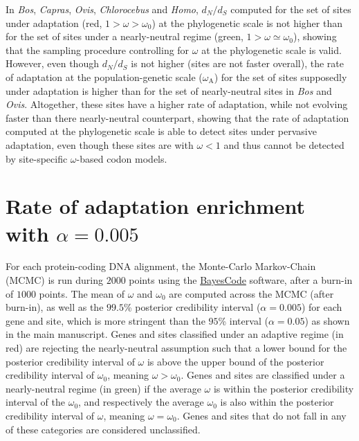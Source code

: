 \documentclass{article}
\renewcommand*{\bm}[1]{#1}%
\newcommand{\dn}{d_N}
\newcommand{\ds}{d_S}
\newcommand{\dnds}{\dn / \ds}
\newcommand{\rateApop}{\omega_{\mathrm{A}}}
\begin{document}
    \pagebreak

    

    In \textit{Bos}, \textit{Capras}, \textit{Ovis}, \textit{Chlorocebus} and \textit{Homo}, $\dnds$ computed for the set of sites under adaptation (red, $1 > \omega > \omega_{0}$) at the phylogenetic scale is not higher than for the set of sites under a nearly-neutral regime (green, $1 > \omega \simeq \omega_{0}$), showing that the sampling procedure controlling for $\omega$ at the phylogenetic scale is valid.
    However, even though $\dnds$ is not higher (sites are not faster overall), the rate of adaptation at the population-genetic scale ($\rateApop$) for the set of sites supposedly under adaptation is higher than for the set of nearly-neutral sites in \textit{Bos} and \textit{Ovis}.
    Altogether, these sites have a higher rate of adaptation, while not evolving faster than there nearly-neutral counterpart, showing that the rate of adaptation computed at the phylogenetic scale is able to detect sites under pervasive adaptation, even though these sites are with $\omega < 1$ and thus cannot be detected by site-specific $\omega$-based codon models.

    \pagebreak


    \section{Rate of adaptation enrichment with $\bm{\alpha=0.005}$}
    \label{sec:threshold}
    For each protein-coding DNA alignment, the Monte-Carlo Markov-Chain (MCMC) is run during $2000$ points using the \href{https://github.com/bayesiancook/bayescode}{BayesCode} software, after a burn-in of $1000$ points.
    The mean of $\omega$ and $\omega_{0}$ are computed across the MCMC (after burn-in), as well as the $99.5$\% posterior credibility interval ($\alpha=0.005$) for each gene and site, which is more stringent than the $95$\% interval ($\alpha=0.05$) as shown in the main manuscript.
    Genes and sites classified under an adaptive regime (in red) are rejecting the nearly-neutral assumption such that a lower bound for the posterior credibility interval of $\omega$ is above the upper bound of the posterior credibility interval of $\omega_{0}$, meaning $\omega > \omega_{0}$.
    Genes and sites are classified under a nearly-neutral regime (in green) if the average $\omega$ is within the posterior credibility interval of the $\omega_{0}$, and respectively the average $\omega_{0}$ is also within the posterior credibility interval of  $\omega$, meaning $\omega = \omega_{0}$.
    Genes and sites that do not fall in any of these categories are considered unclassified.
\end{document}
